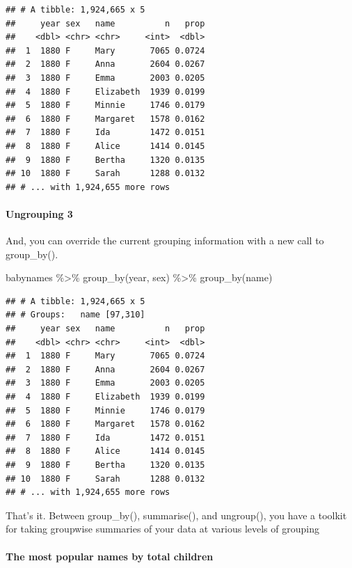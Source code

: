 \documentclass[
]{article}
\newenvironment{Shaded}{\begin{snugshade}}{\end{snugshade}}
\newcommand{\FunctionTok}[1]{\textcolor[rgb]{0.00,0.00,0.00}{#1}}
\newcommand{\NormalTok}[1]{#1}
\newcommand{\SpecialCharTok}[1]{\textcolor[rgb]{0.00,0.00,0.00}{#1}}
\begin{document}
\begin{verbatim}
## # A tibble: 1,924,665 x 5
##     year sex   name          n   prop
##    <dbl> <chr> <chr>     <int>  <dbl>
##  1  1880 F     Mary       7065 0.0724
##  2  1880 F     Anna       2604 0.0267
##  3  1880 F     Emma       2003 0.0205
##  4  1880 F     Elizabeth  1939 0.0199
##  5  1880 F     Minnie     1746 0.0179
##  6  1880 F     Margaret   1578 0.0162
##  7  1880 F     Ida        1472 0.0151
##  8  1880 F     Alice      1414 0.0145
##  9  1880 F     Bertha     1320 0.0135
## 10  1880 F     Sarah      1288 0.0132
## # ... with 1,924,655 more rows
\end{verbatim}

\hypertarget{ungrouping-3-1}{%
\paragraph{Ungrouping 3}\label{ungrouping-3-1}}

And, you can override the current grouping information with a new call
to group\_by().

\begin{Shaded}
\begin{Highlighting}[]
\NormalTok{babynames }\SpecialCharTok{\%\textgreater{}\%}
  \FunctionTok{group\_by}\NormalTok{(year, sex) }\SpecialCharTok{\%\textgreater{}\%} 
  \FunctionTok{group\_by}\NormalTok{(name)}
\end{Highlighting}
\end{Shaded}

\begin{verbatim}
## # A tibble: 1,924,665 x 5
## # Groups:   name [97,310]
##     year sex   name          n   prop
##    <dbl> <chr> <chr>     <int>  <dbl>
##  1  1880 F     Mary       7065 0.0724
##  2  1880 F     Anna       2604 0.0267
##  3  1880 F     Emma       2003 0.0205
##  4  1880 F     Elizabeth  1939 0.0199
##  5  1880 F     Minnie     1746 0.0179
##  6  1880 F     Margaret   1578 0.0162
##  7  1880 F     Ida        1472 0.0151
##  8  1880 F     Alice      1414 0.0145
##  9  1880 F     Bertha     1320 0.0135
## 10  1880 F     Sarah      1288 0.0132
## # ... with 1,924,655 more rows
\end{verbatim}

That's it. Between group\_by(), summarise(), and ungroup(), you have a
toolkit for taking groupwise summaries of your data at various levels of
grouping

\hypertarget{the-most-popular-names-by-total-children}{%
\paragraph{The most popular names by total
children}\label{the-most-popular-names-by-total-children}}
\end{document}

